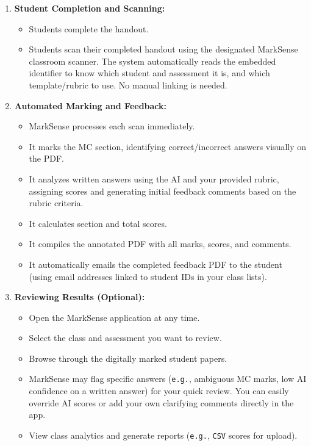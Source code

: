 \documentclass[11pt, a4paper]{article}
\begin{document}
\begin{enumerate}
    \item \textbf{Student Completion and Scanning:}
        \begin{itemize} %
            \item Students complete the handout.
            \item Students scan their completed handout using the designated MarkSense classroom scanner. The system automatically reads the embedded identifier to know which student and assessment it is, and which template/rubric to use. No manual linking is needed.
        \end{itemize} %

    \item \textbf{Automated Marking and Feedback:}
        \begin{itemize} %
            \item MarkSense processes each scan immediately.
            \item It marks the MC section, identifying correct/incorrect answers visually on the PDF.
            \item It analyzes written answers using the AI and your provided rubric, assigning scores and generating initial feedback comments based on the rubric criteria.
            \item It calculates section and total scores.
            \item It compiles the annotated PDF with all marks, scores, and comments.
            \item It automatically emails the completed feedback PDF to the student (using email addresses linked to student IDs in your class lists).
        \end{itemize} %

    \item \textbf{Reviewing Results (Optional):}
        \begin{itemize} %
            \item Open the MarkSense application at any time.
            \item Select the class and assessment you want to review.
            \item Browse through the digitally marked student papers.
            \item MarkSense may flag specific answers (\texttt{e.g.}, ambiguous MC marks, low AI confidence on a written answer) for your quick review. You can easily override AI scores or add your own clarifying comments directly in the app.
            \item View class analytics and generate reports (\texttt{e.g.}, \texttt{CSV} scores for upload).
        \end{itemize} %
\end{enumerate} %
\end{document}
